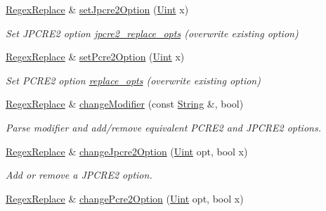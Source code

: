 \begin{DoxyCompactItemize}
\hyperlink{classjpcre2_1_1RegexReplace}{Regex\+Replace} \& \hyperlink{classjpcre2_1_1RegexReplace_a745ab0b979035214a83ed0a04686ef6a_a745ab0b979035214a83ed0a04686ef6a}{set\+Jpcre2\+Option} (\hyperlink{namespacejpcre2_a078242d38221a13fb3543b9edd78c099}{Uint} x)
\begin{DoxyCompactList}\small\item\em Set J\+P\+C\+R\+E2 option \hyperlink{classjpcre2_1_1RegexReplace_acf13bcb16918df4b7bcaa7e49a1c7d59}{jpcre2\+\_\+replace\+\_\+opts} (overwrite existing option) \end{DoxyCompactList}\item 
\hyperlink{classjpcre2_1_1RegexReplace}{Regex\+Replace} \& \hyperlink{classjpcre2_1_1RegexReplace_aec36272d351fdc3a8cb02a4a3efea5a2_aec36272d351fdc3a8cb02a4a3efea5a2}{set\+Pcre2\+Option} (\hyperlink{namespacejpcre2_a078242d38221a13fb3543b9edd78c099}{Uint} x)
\begin{DoxyCompactList}\small\item\em Set P\+C\+R\+E2 option \hyperlink{classjpcre2_1_1RegexReplace_afc79699cfcad8b7cbb26864b6b67cdc7}{replace\+\_\+opts} (overwrite existing option) \end{DoxyCompactList}\item 
\hyperlink{classjpcre2_1_1RegexReplace}{Regex\+Replace} \& \hyperlink{classjpcre2_1_1RegexReplace_a0a2dc39fc28e6f7fe0a5d638f5891bdb_a0a2dc39fc28e6f7fe0a5d638f5891bdb}{change\+Modifier} (const \hyperlink{namespacejpcre2_a91f03070152fb228bc116c5a737f1d16}{String} \&, bool)
\begin{DoxyCompactList}\small\item\em Parse modifier and add/remove equivalent P\+C\+R\+E2 and J\+P\+C\+R\+E2 options. \end{DoxyCompactList}\item 
\hyperlink{classjpcre2_1_1RegexReplace}{Regex\+Replace} \& \hyperlink{classjpcre2_1_1RegexReplace_afebf5e76bce8e312ab6dbdec3288b02b_afebf5e76bce8e312ab6dbdec3288b02b}{change\+Jpcre2\+Option} (\hyperlink{namespacejpcre2_a078242d38221a13fb3543b9edd78c099}{Uint} opt, bool x)
\begin{DoxyCompactList}\small\item\em Add or remove a J\+P\+C\+R\+E2 option. \end{DoxyCompactList}\item 
\hyperlink{classjpcre2_1_1RegexReplace}{Regex\+Replace} \& \hyperlink{classjpcre2_1_1RegexReplace_aea15c694bba7d994f048596a1f90f71f_aea15c694bba7d994f048596a1f90f71f}{change\+Pcre2\+Option} (\hyperlink{namespacejpcre2_a078242d38221a13fb3543b9edd78c099}{Uint} opt, bool x)

\end{DoxyCompactItemize}
